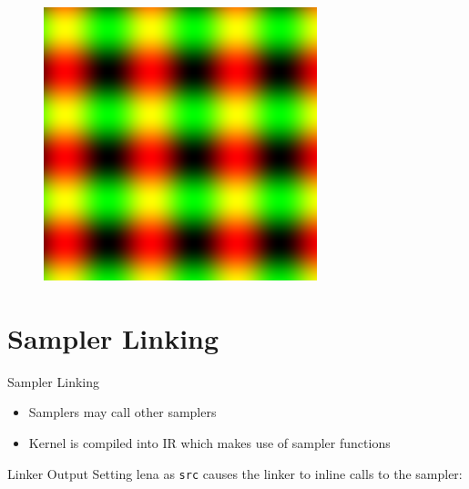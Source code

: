 \documentclass{beamer}
\newcommand{\bi}{\begin{itemize}}
\newcommand{\ei}{\end{itemize}}
\begin{document}
\begin{frame}
  \begin{figure}\centering
  \includegraphics[height=\textheight]{examples/sin-example}
  \end{figure}
\end{frame}


\section{Sampler Linking} %

\begin{frame}{Sampler Linking}
  \bi
    \item Samplers may call other samplers
    
    \item Kernel is compiled into IR which makes use of sampler functions
  \ei
\end{frame}

\begin{frame}
    
    \scalebox{0.8}{}
\end{frame}

\begin{frame}{Linker Output}
  Setting lena as \texttt{src} causes the linker to inline calls to
  the sampler:
  \scalebox{0.75}{}
\end{frame}
\end{document}

